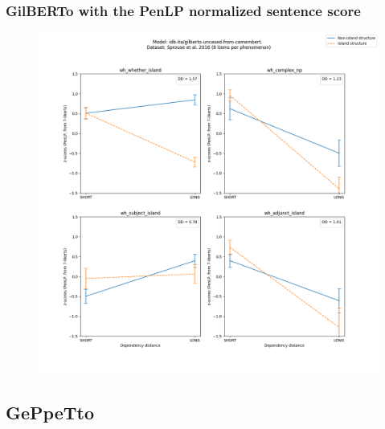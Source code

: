 \subsubsection{GilBERTo with the PenLP normalized sentence score}
\begin{figure}[h]
	\centering
	\includegraphics[width=1\textwidth]{images/AppendixA/Sprouse_wh_idb-ita_gilberto-uncased-from-camembert_PenLP-zscores-likert-2022-09-16_h10m00s24.png} 
	\label{A-fig:sprouse_gilberto_penlp}
	\caption{}
\end{figure}

\clearpage
\subsection{GePpeTto}

